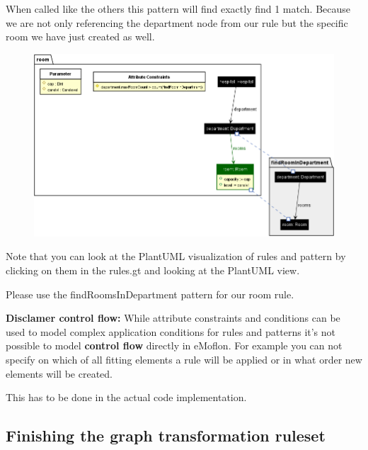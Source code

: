 When called like the others this pattern will find exactly find 1 match. Because we are not only referencing the department node from our rule but the specific room we have just created as well.

\begin{figure}[h]
    \centering
    \includegraphics[scale = 0.43]{pictures/findRoomInDepartment.png}
    \caption{}
    \label{attributeConstrains}

\end{figure}

Note that you can look at the PlantUML visualization of rules and pattern by clicking on them in the \textsf{rules.gt} and looking at the PlantUML view. \newline

Please use the \textsf{findRoomsInDepartment} pattern for our room rule.\newline

\textbf{Disclamer control flow:}\newline
While attribute constraints and conditions can be used to model complex application conditions for rules and patterns
it's not possible to model \textbf{control flow} directly in eMoflon. For example you can not specify on which of all fitting elements a rule will be applied or in what order new elements will be created.

This has to be done in the actual code implementation.



\clearpage

\subsection{Finishing the graph transformation ruleset}

